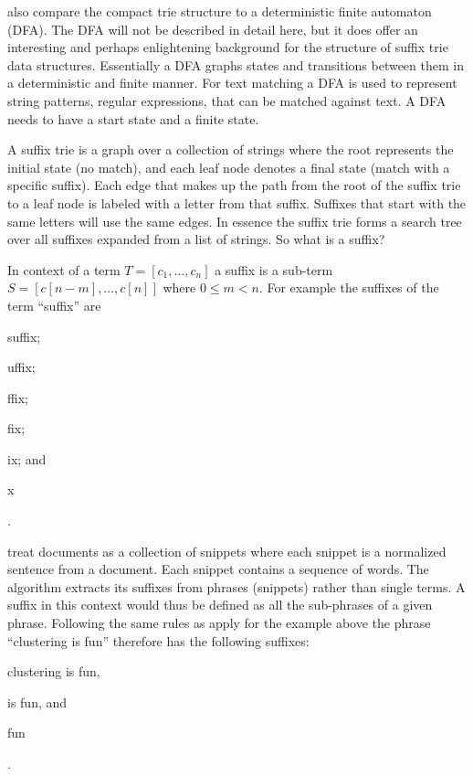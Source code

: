 \citeauthor{Baeza-Yates2011c} also compare the compact trie structure to a deterministic finite automaton (DFA). The DFA will not be described in detail here, but it does offer an interesting and perhaps enlightening background for the structure of suffix trie data structures. Essentially a DFA graphs states and transitions between them in a deterministic and finite manner. For text matching a DFA is used to represent string patterns, regular expressions, that can be matched against text. A DFA needs to have a start state and a finite state.

A suffix trie is a graph over a collection of strings where the root represents the initial state (no match), and each leaf node denotes a final state (match with a specific suffix). Each edge that makes up the path from the root of the suffix trie to a leaf node is labeled with a letter from that suffix. Suffixes that start with the same letters will use the same edges. In essence the suffix trie forms a search tree over all suffixes expanded from a list of strings. So what is a suffix?

In context of a term \(T = [c_{1}, ..., c_{n}]\) a suffix is a sub-term \(S = [c[n-m], \dots, c[n]]\) where \(0 \le m < n\). For example the suffixes of the term ``suffix'' are
\begin{inparaenum}[\itshape 1\upshape)]
\item suffix;
\item uffix;
\item ffix;
\item fix;
\item ix; and
\item x
\end{inparaenum}.

\cite{Oren1998} treat documents as a collection of snippets where each snippet is a normalized sentence from a document. Each snippet contains a sequence of words. The \STC algorithm extracts its suffixes from phrases (snippets) rather than single terms. A suffix in this context would thus be defined as all the sub-phrases of a given phrase. Following the same rules as apply for the example above the phrase ``clustering is fun'' therefore has the following suffixes:
\begin{inparaenum}[\itshape 1\upshape)]
\item clustering is fun,
\item is fun, and
\item fun
\end{inparaenum}.

